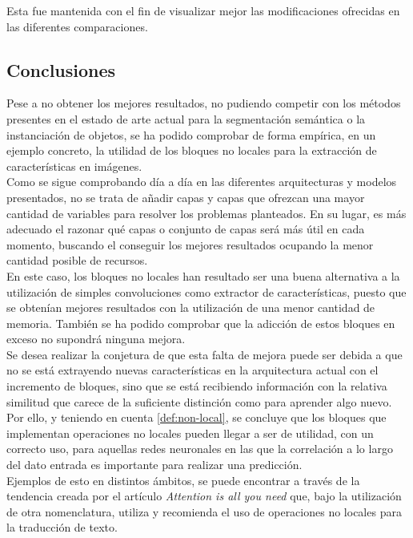 Esta fue mantenida con el fin de visualizar mejor las modificaciones ofrecidas en las diferentes comparaciones.

\subsection{Conclusiones}
Pese a no obtener los mejores resultados, no pudiendo competir con los métodos presentes en el estado de arte actual para la segmentación semántica o la instanciación de objetos, se ha podido comprobar de forma empírica, en un ejemplo concreto, la utilidad de los bloques no locales para la extracción de características en imágenes.\\

Como se sigue comprobando día a día en las diferentes arquitecturas y modelos presentados, no se trata de añadir capas y capas que ofrezcan una mayor cantidad de variables para resolver los problemas planteados. En su lugar, es más adecuado el razonar qué capas o conjunto de capas será más útil en cada momento, buscando el conseguir los mejores resultados ocupando la menor cantidad posible de recursos.\\

En este caso, los bloques no locales han resultado ser una buena alternativa a la utilización de simples convoluciones como extractor de características, puesto que se obtenían mejores resultados con la utilización de una menor cantidad de memoria. También se ha podido comprobar que la adicción de estos bloques en exceso no supondrá ninguna mejora.\\

Se desea realizar la conjetura de que esta falta de mejora puede ser debida a que no se está extrayendo nuevas características en la arquitectura actual con el incremento de bloques, sino que se está recibiendo información con la relativa similitud que carece de la suficiente distinción como para aprender algo nuevo. \\

Por ello, y teniendo en cuenta \autoref{def:non-local}, se concluye que los bloques que implementan operaciones no locales pueden llegar a ser de utilidad, con un correcto uso, para aquellas redes neuronales en las que la correlación a lo largo del dato entrada es importante para realizar una predicción.\\

Ejemplos de esto en distintos ámbitos, se puede encontrar a través de la tendencia creada por el artículo \emph{Attention is all you need} \cite{DBLP:journals/corr/VaswaniSPUJGKP17} que, bajo la utilización de otra nomenclatura, utiliza y recomienda el uso de operaciones no locales para la traducción de texto.
